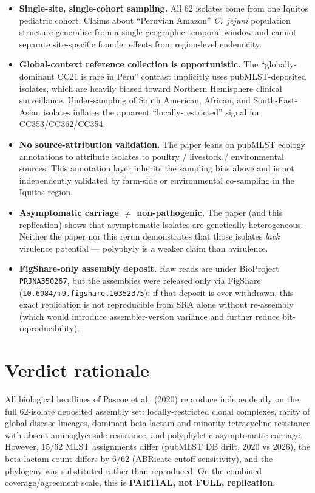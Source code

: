 \documentclass[11pt]{article}
\begin{document}
\begin{itemize}[leftmargin=1.5em]
  \item \textbf{Single-site, single-cohort sampling.} All 62 isolates come from
        one Iquitos pediatric cohort. Claims about ``Peruvian Amazon''
        \emph{C.\ jejuni} population structure generalise from a single
        geographic-temporal window and cannot separate site-specific
        founder effects from region-level endemicity.
  \item \textbf{Global-context reference collection is opportunistic.} The
        ``globally-dominant CC21 is rare in Peru'' contrast implicitly uses
        pubMLST-deposited isolates, which are heavily biased toward Northern
        Hemisphere clinical surveillance. Under-sampling of South American,
        African, and South-East-Asian isolates inflates the apparent
        ``locally-restricted'' signal for CC353/CC362/CC354.
  \item \textbf{No source-attribution validation.} The paper leans on pubMLST
        ecology annotations to attribute isolates to poultry / livestock /
        environmental sources. This annotation layer inherits the sampling
        bias above and is not independently validated by farm-side or
        environmental co-sampling in the Iquitos region.
  \item \textbf{Asymptomatic carriage $\ne$ non-pathogenic.} The paper (and
        this replication) shows that asymptomatic isolates are genetically
        heterogeneous. Neither the paper nor this rerun demonstrates that
        those isolates \emph{lack} virulence potential --- polyphyly is a
        weaker claim than avirulence.
  \item \textbf{FigShare-only assembly deposit.} Raw reads are under
        BioProject \texttt{PRJNA350267}, but the assemblies were released
        only via FigShare (\texttt{10.6084/m9.figshare.10352375}); if that
        deposit is ever withdrawn, this exact replication is not
        reproducible from SRA alone without re-assembly (which would
        introduce assembler-version variance and further reduce
        bit-reproducibility).
\end{itemize}

\section{Verdict rationale}

All biological headlines of Pascoe et al.\ (2020) reproduce independently on
the full 62-isolate deposited assembly set: locally-restricted clonal
complexes, rarity of global disease lineages, dominant beta-lactam and
minority tetracycline resistance with absent aminoglycoside resistance, and
polyphyletic asymptomatic carriage. However, 15/62 MLST assignments differ
(pubMLST DB drift, 2020 vs 2026), the beta-lactam count differs by 6/62
(ABRicate cutoff sensitivity), and the phylogeny was substituted rather than
reproduced. On the combined coverage/agreement scale, this is
\textbf{PARTIAL, not FULL, replication}.
\end{document}
